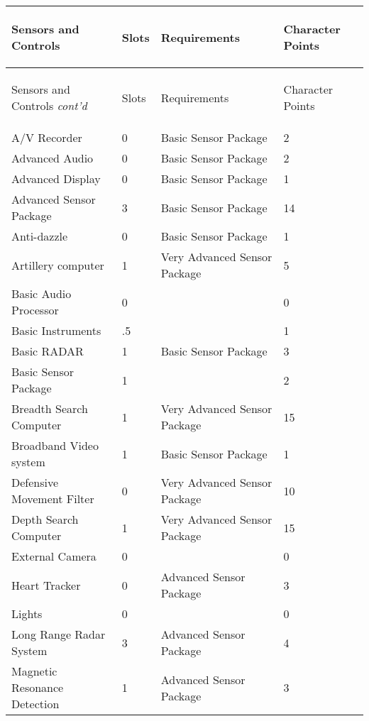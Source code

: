 \documentclass[twoside]{book}
\begin{document}
\begin{longtable}{p{1.25in}lll} 
  Sensors and Controls& \begin{turn}{70}{Slots}\end{turn}
          & \begin{turn}{70}{Requirements}\end{turn}
          & \begin{turn}{70}{Character Points}\end{turn}
          \\
  \hline
  \hline
  \endfirsthead
  Sensors and Controls \textit{cont'd}
        & \begin{turn}{70}{Slots}\end{turn}
          & \begin{turn}{70}{Requirements}\end{turn}
          & \begin{turn}{70}{Character Points}\end{turn}
           \\
  \hline
  \endhead
\raggedright  A/V Recorder& 0& Basic Sensor Package& 2\tabularnewline
      \raggedright  Advanced Audio& 0& Basic Sensor Package& 2\tabularnewline
      \raggedright  Advanced Display& 0& Basic Sensor Package& 1\tabularnewline
      \raggedright  Advanced Sensor Package& 3& Basic Sensor Package& 14\tabularnewline
      \raggedright  Anti-dazzle& 0& Basic Sensor Package& 1\tabularnewline
      \raggedright  Artillery computer& 1& Very Advanced Sensor
           Package& 5\tabularnewline
      \raggedright  Basic Audio Processor& 0&& 0\tabularnewline
      \raggedright  Basic Instruments& .5&& 1\tabularnewline
      \raggedright  Basic RADAR& 1& Basic Sensor Package& 3\tabularnewline
      \raggedright  Basic Sensor Package& 1&& 2\tabularnewline
      \raggedright  Breadth Search Computer& 1& Very Advanced Sensor
           Package& 15\tabularnewline
      \raggedright  Broadband Video system& 1& Basic Sensor Package& 1\tabularnewline
      \raggedright  Defensive Movement Filter& 0& Very Advanced Sensor
           Package& 10\tabularnewline
      \raggedright  Depth Search Computer& 1& Very Advanced Sensor
           Package& 15\tabularnewline
      \raggedright  External Camera& 0&& 0\tabularnewline
      \raggedright  Heart Tracker& 0& Advanced Sensor Package& 3\tabularnewline
      \raggedright  Lights& 0&& 0\tabularnewline
      \raggedright  Long Range Radar System& 3& Advanced Sensor Package& 4\tabularnewline
      \raggedright  Magnetic Resonance Detection& 1& Advanced Sensor Package& 3\tabularnewline

\end{longtable}
\end{document}
